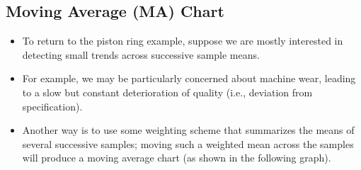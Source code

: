 \documentclass[]{report}
\begin{document}
\newpage
\subsection{Moving Average (MA) Chart}

\begin{itemize}
\item To return to the piston ring example, suppose we are mostly interested in detecting small trends across successive sample means. 
\item For example, we may be particularly concerned about machine wear, leading to a slow but constant deterioration of quality (i.e., deviation from specification). 

\item Another way is to use some weighting scheme that summarizes the means of several successive samples; moving such a weighted mean across the samples will produce a moving average chart (as shown in the following graph).
\end{itemize}
%
%
%
\newpage
\end{document}
